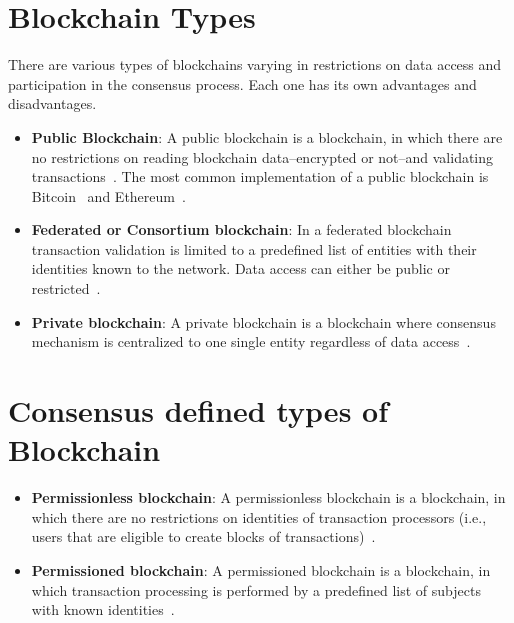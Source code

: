 \section{Blockchain Types}\label{blockchain:blockchain_types}

There are various types of blockchains varying in restrictions on data access and participation in the consensus process. Each one has its own advantages and disadvantages.

\begin{itemize}
  \item \textbf{Public Blockchain}: A public blockchain is a blockchain, in which there are no restrictions on reading blockchain data--encrypted or not--and validating transactions~\cite{prbc_vs_pubbc}.
  The most common implementation of a public blockchain is Bitcoin~\cite{nakamoto2012bitcoin} and Ethereum~\cite{ethash}.
  \item \textbf{Federated or Consortium blockchain}: In a federated blockchain transaction validation is limited to a predefined list of entities with their identities known to the network. Data access can either be public or restricted~\cite{prbc_vs_pubbc}.
  \item \textbf{Private blockchain}: A private blockchain is a blockchain where consensus mechanism is centralized to one single entity regardless of data access~\cite{prbc_vs_pubbc}.
\end{itemize}

\section{Consensus defined types of Blockchain}\label{blockchain:consensus_blockchain_types}

\begin{itemize}
  \item \textbf{Permissionless blockchain}: A permissionless blockchain is a blockchain, in which there are no restrictions on identities of transaction processors (i.e., users that are eligible to create blocks of transactions)~\cite{prbc_vs_pubbc}.
  \item \textbf{Permissioned blockchain}: A permissioned blockchain is a blockchain, in which transaction processing is performed by a predefined list of subjects with known identities~\cite{prbc_vs_pubbc}.
\end{itemize}

